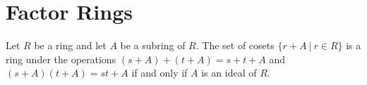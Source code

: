 \section{Factor Rings}

\begin{theorem}
	Let $R$ be a ring and let $A$ be a subring of $R$. The set of cosets $\{r + A\ \vert\ r \in R\}$ is a ring under the operations $(s + A) + (t + A) = s + t + A$ and $(s+A)(t+A)=st+A$ if and only if $A$ is an ideal of $R$.
\end{theorem}
